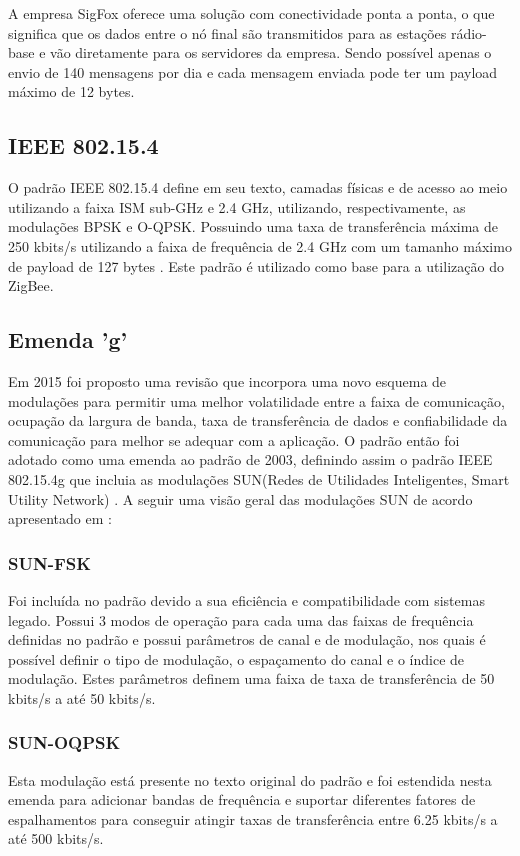 A empresa SigFox oferece uma solução com conectividade ponta a ponta, o que significa que os dados entre o nó final são transmitidos para as estações rádio-base e vão diretamente para os servidores da empresa. Sendo possível apenas o envio de 140 mensagens por dia e cada mensagem enviada pode ter um payload máximo de 12 bytes.

\subsection{IEEE 802.15.4}
O padrão IEEE 802.15.4 define em seu texto, camadas físicas e de acesso ao meio utilizando a faixa ISM sub-GHz e 2.4 GHz, utilizando, respectivamente, as modulações BPSK e O-QPSK. Possuindo uma taxa de transferência máxima de 250 kbits/s utilizando a faixa de frequência de 2.4 GHz com um tamanho máximo de payload de 127 bytes \cite{munoz2018overview} \cite{gomes2017estimaccao}. Este padrão é utilizado como base para a utilização do ZigBee.

\subsection*{Emenda 'g'}
Em 2015 foi proposto uma revisão que incorpora uma novo esquema de modulações para permitir uma melhor volatilidade entre a faixa de comunicação, ocupação da largura de banda, taxa de transferência de dados e confiabilidade da comunicação para melhor se adequar com a aplicação. O padrão então foi adotado como uma emenda ao padrão de 2003, definindo assim o padrão IEEE 802.15.4g que incluia as modulações SUN(Redes de Utilidades Inteligentes, Smart Utility Network) \cite{tuset2020reliability}.
A seguir uma visão geral das modulações SUN de acordo apresentado em \cite{tuset2020reliability}:
\subsubsection*{SUN-FSK}
Foi incluída no padrão devido a sua eficiência e compatibilidade com sistemas legado. Possui 3 modos de operação para cada uma das faixas de frequência definidas no padrão e possui parâmetros de canal e de modulação, nos quais é possível definir o tipo de modulação, o espaçamento do canal e o índice de modulação. Estes parâmetros definem uma faixa de taxa de transferência de 50 kbits/s a até 50 kbits/s.
\subsubsection*{SUN-OQPSK}
Esta modulação está presente no texto original do padrão e foi estendida nesta emenda para adicionar bandas de frequência e suportar diferentes fatores de espalhamentos para conseguir atingir taxas de transferência entre 6.25 kbits/s a até 500 kbits/s.
